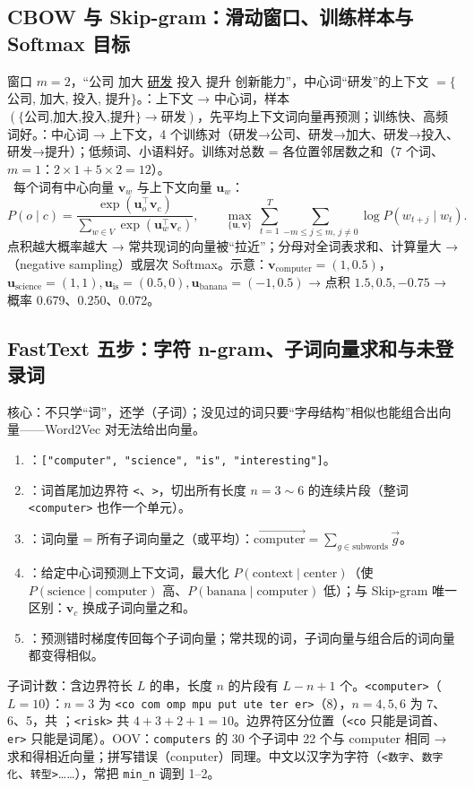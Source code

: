 \subsection{CBOW 与 Skip-gram：滑动窗口、训练样本与 Softmax 目标}
窗口 $m=2$，“公司 加大 \underline{研发} 投入 提升 创新能力”，中心词“研发”的上下文 $=\{$公司, 加大, 投入, 提升$\}$。：上下文 → 中心词，样本 $(\{\text{公司,加大,投入,提升}\}\to\text{研发})$，先平均上下文词向量再预测；训练快、高频词好。：中心词 → 上下文，4 个训练对（研发→公司、研发→加大、研发→投入、研发→提升）；低频词、小语料好。训练对总数 = 各位置邻居数之和（7 个词、$m=1$：$2\times1+5\times2=12$）。\\
\tagext\ 每个词有中心向量 $\bm v_w$ 与上下文向量 $\bm u_w$：
\[
P(o\mid c)=\frac{\exp(\bm u_o^\top\bm v_c)}{\sum_{w\in V}\exp(\bm u_w^\top\bm v_c)},\qquad
\max_{\{\bm u,\bm v\}}\ \sum_{t=1}^{T}\sum_{-m\le j\le m,\,j\ne0}\log P(w_{t+j}\mid w_t).
\]
点积越大概率越大 → 常共现词的向量被“拉近”；分母对全词表求和、计算量大 → （negative sampling）或层次 Softmax。示意：$\bm v_{\text{computer}}=(1,0.5)$，$\bm u_{\text{science}}=(1,1),\bm u_{\text{is}}=(0.5,0),\bm u_{\text{banana}}=(-1,0.5)$ → 点积 $1.5, 0.5, -0.75$ → 概率 0.679、0.250、0.072。

\subsection{FastText 五步：字符 n-gram、子词向量求和与未登录词}
核心：不只学“词”，还学（子词）；没见过的词只要“字母结构”相似也能组合出向量——Word2Vec 对无法给出向量。
\begin{enumerate}
\item {}：\texttt{["computer", "science", "is", "interesting"]}。
\item {}：词首尾加边界符 \texttt{<}、\texttt{>}，切出所有长度 $n=3\sim6$ 的连续片段（整词 \texttt{<computer>} 也作一个单元）。
\item {}：词向量 = 所有子词向量之（或平均）：$\vec{\text{computer}}=\sum_{g\in\text{subwords}}\vec g$。
\item {}：给定中心词预测上下文词，最大化 $P(\text{context}\mid\text{center})$（使 $P(\text{science}\mid\text{computer})$ 高、$P(\text{banana}\mid\text{computer})$ 低）；与 Skip-gram 唯一区别：$\bm v_c$ 换成子词向量之和。
\item {}：预测错时梯度传回每个子词向量；常共现的词，子词向量与组合后的词向量都变得相似。
\end{enumerate}
子词计数：含边界符长 $L$ 的串，长度 $n$ 的片段有 $L-n+1$ 个。\texttt{<computer>}（$L=10$）：$n=3$ 为 \texttt{<co com omp mpu put ute ter er>}（8），$n=4,5,6$ 为 7、6、5，共 ；\texttt{<risk>} 共 $4+3+2+1=10$。边界符区分位置（\texttt{<co} 只能是词首、\texttt{er>} 只能是词尾）。OOV：\texttt{computers} 的 30 个子词中 22 个与 computer 相同 → 求和得相近向量；拼写错误（conputer）同理。中文以汉字为字符（\texttt{<数字}、\texttt{数字化}、\texttt{转型>}……），常把 \texttt{min\_n} 调到 1–2。

